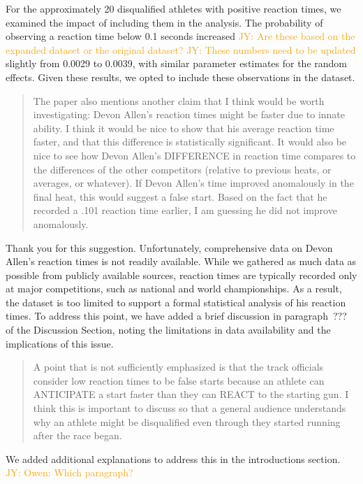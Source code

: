 \documentclass[12pt]{article}
\newcommand{\jy}[1]{\textcolor{orange}{JY: #1}}
\newenvironment{comment}%
{\begin{quotation}\noindent\small\it\color{darkblue}\ignorespaces%
}{\end{quotation}}
\begin{document}
For the approximately 20 disqualified athletes with positive reaction
times, we examined the impact of including them in the analysis. The
probability of observing a reaction time below 0.1 seconds increased
\jy{Are these based on the expanded dataset or the original dataset?}
\jy{These numbers need to be updated}
slightly from 0.0029 to 0.0039, with similar parameter estimates for
the random effects. Given these results, we opted to include these
observations in the dataset.


\begin{comment}
The paper also mentions another claim that I think would be worth investigating:
Devon Allen’s reaction times might be faster due to innate ability. I think it
would be nice to show that his average reaction time faster, and that this
difference is statistically significant. It would also be nice to see how Devon
Allen’s DIFFERENCE in reaction time compares to the differences of the other
competitors (relative to previous heats, or averages, or whatever). If Devon
Allen’s time improved anomalously in the final heat, this would suggest a false
start. Based on the fact that he recorded a .101 reaction time earlier, I am
guessing he did not improve anomalously.
\end{comment}


Thank you for this suggestion. Unfortunately, comprehensive data on 
Devon Allen’s reaction times is not readily available. While we gathered 
as much data as possible from publicly available sources, reaction times 
are typically recorded only at major competitions, such as national and 
world championships. As a result, the dataset is too limited to support 
a formal statistical analysis of his reaction times.
To address this point, we have added a brief discussion in 
paragraph~??? of the Discussion Section, noting the limitations in data 
availability and the implications of this issue.


\begin{comment}
A point that is not sufficiently emphasized is that the track officials consider
low reaction times to be false starts because an athlete can ANTICIPATE a start
faster than they can REACT to the starting gun. I think this is important to
discuss so that a general audience understands why an athlete might be
disqualified even through they started running after the race began.
\end{comment}

We added additional explanations to address this in the introductions section.
\jy{Owen: Which paragraph?}
\end{document}
